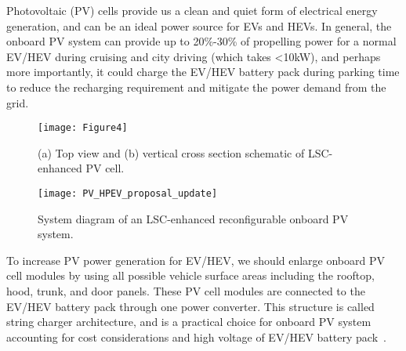 \graphicspath{{./figs/}{./figs/item-yanzhi/}}

Photovoltaic (PV) cells provide us a clean and quiet form of electrical energy generation, and can be an ideal power source for EVs and HEVs. In general, the onboard PV system can provide up to 20\%-30\% of propelling power for a normal EV/HEV during cruising and city driving (which takes <10kW), and perhaps more importantly, it could charge the EV/HEV battery pack during parking time to reduce the recharging requirement and mitigate the power demand from the grid.

\begin{figure}[h]
    \centering
    \texttt{[image: Figure4]}
    \caption{(a) Top view and (b) vertical cross section schematic of LSC-enhanced PV cell.}
    \label{fig:1}
\end{figure}




\begin{figure}[h]
    \centering
    \texttt{[image: PV\_HPEV\_proposal\_update]}
    \caption{System diagram of an LSC-enhanced reconfigurable onboard PV
system.}
    \label{fig:2}
\end{figure}



To increase PV power generation for EV/HEV, we should enlarge onboard PV cell modules by using all possible vehicle surface areas including the rooftop, hood, trunk, and door panels. These PV cell modules are connected to the EV/HEV battery pack through one power converter. This structure is called string charger architecture, and is a practical choice for onboard PV system accounting for cost considerations and high voltage of EV/HEV battery pack~\cite{xiao2007topology,hamilton2010system}.

